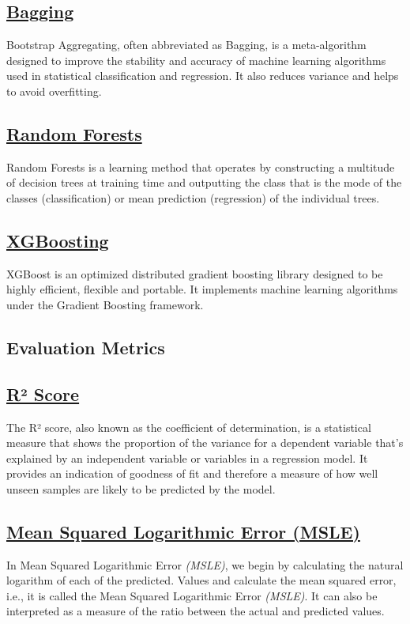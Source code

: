 \documentclass[conference]{IEEEtran}
\begin{document}
    \subsection{\href{https://en.wikipedia.org/wiki/Bootstrap_aggregating}{Bagging}}
    Bootstrap Aggregating, often abbreviated as Bagging, is a meta-algorithm designed to improve the stability and accuracy of machine learning algorithms used in statistical classification and regression. It also reduces variance and helps to avoid overfitting.
    \subsection{\href{https://en.wikipedia.org/wiki/Random_forest}{Random Forests}}
    Random Forests is a learning method that operates by constructing a multitude of decision trees at training time and outputting the class that is the mode of the classes (classification) or mean prediction (regression) of the individual trees.
    
    \subsection{\href{https://en.wikipedia.org/wiki/XGBoost}{XGBoosting}}
    XGBoost is an optimized distributed gradient boosting library designed to be highly efficient, flexible and portable. It implements machine learning algorithms under the Gradient Boosting framework.
    
    \subsection*{Evaluation Metrics}
    
    \subsection*{\href{https://en.wikipedia.org/wiki/Coefficient_of_determination}{R² Score}}
        The R² score, also known as the coefficient of determination, is a statistical measure that shows the proportion of the variance for a dependent variable that's explained by an independent variable or variables in a regression model. It provides an indication of goodness of fit and therefore a measure of how well unseen samples are likely to be predicted by the model.

    
    
    \subsection*{\href{https://insideaiml.com/blog/MeanSquared-Logarithmic-Error-Loss-1035}{Mean Squared Logarithmic Error (MSLE)}}
        In Mean Squared Logarithmic Error \textit{(MSLE)}, we begin by calculating the natural logarithm of each of the predicted. Values and calculate the mean squared error, i.e., it is called the Mean Squared Logarithmic Error \textit{(MSLE)}.
        It can also be interpreted as a measure of the ratio between the actual and predicted values.
\end{document}
